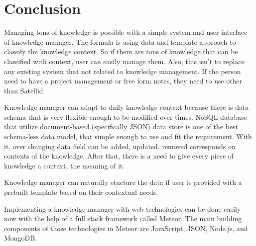 \section{Conclusion}
\label{sec:conclusion}

Managing tons of knowledge is possible with a simple system and user interface of knowledge manager.
The formula is using data and template approach to classify the knowledge context.
So if there are tons of knowledge that can be classified with context, user can easily manage them.
Also, this isn't to replace any existing system that not related to knowledge management.
If the person need to have a project management or free form notes, they need to use other than Satellid.

Knowledge manager can adapt to daily knowledge context because there is data schema that is very flexible enough to be modified over times.
\ac{NoSQL} database that utilize document-based (specifically \ac{JSON}) data store is one of the best schema-less data model, that simple enough to use and fit the requirement.
With it, over changing data field can be added, updated, removed corresponds on contents of the knowledge.
After that, there is a need to give every piece of knowledge a context, the meaning of it.

Knowledge manager can naturally stucture the data if user is provided with a prebuilt template based on their contextual needs.

Implementing a knowledge manager with web technologies can be done easily now with the help of a full stack framework called Meteor.
The main building components of those technologies in Meteor are JavaScript, JSON, Node.js, and MongoDB.
